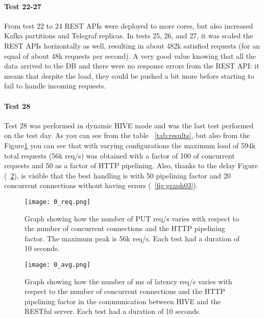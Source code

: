 \documentclass[]{IEEEtran}
\begin{document}
\paragraph{Test 22-27}
From test 22 to 24 REST APIs were deployed to more cores, but also increased Kafka partitions and Telegraf replicas.
In tests 25, 26, and 27, it was scaled the REST APIs horizontally as well, resulting in about 482k satisfied requests (for an equal of about 48k requests per second). A very good value knowing that all the data arrived to the DB and there were no response errors from the REST API: it means that despite the load, they could be pushed a bit more before starting to fail to handle incoming requests.

\paragraph{Test 28}
Test 28 was performed in dynamic HIVE mode and was the last test performed on the test day. As you can see from the table ~\ref{tab:results}, but also from the Figure\ref{fig:graph01} you can see that with varying configurations the maximum load of 594k total requests (56k req/s) was obtained with a factor of 100 of concurrent requests and 50 as a factor of HTTP pipelining.
Also, thanks to the delay Figure (~\ref{fig:graph02}), is visible that the best handling is with 50 pipelining factor and 20 concurrent connections without having errors (~\ref{fig:graph03}).

\begin{figure}[ht]
\centering
\texttt{[image: 0\_req.png]}
\vspace{-0.25cm}
\caption{Graph showing how the number of PUT req/s varies with respect to the number of concurrent connections and the HTTP pipelining factor. The maximum peak is 56k req/s. Each test had a duration of 10 seconds.}
\label{fig:graph01}
\vspace{-0.25cm}
\end{figure}

\begin{figure}[ht]
\centering
\texttt{[image: 0\_avg.png]}
\vspace{-0.25cm}
\caption{Graph showing how the number of ms of latency req/s varies with respect to the number of concurrent connections and the HTTP pipelining factor in the communication between HIVE and the RESTful server. Each test had a duration of 10 seconds.}
\label{fig:graph02}
\vspace{-0.25cm}
\end{figure}
\end{document}
